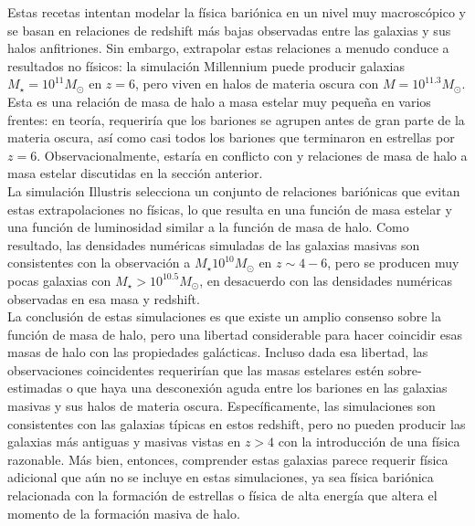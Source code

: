 \documentclass{article}
\begin{document}
Estas recetas intentan modelar la física bariónica en un nivel muy macroscópico y se basan en relaciones de redshift más bajas observadas entre las galaxias y sus halos anfitriones. Sin embargo, extrapolar estas relaciones a menudo conduce a resultados no físicos: la simulación Millennium  puede producir galaxias $M_\star = 10^{11}M_\odot$ en $z = 6$, pero viven en halos de materia oscura con $M = 10^{11.3}M_\odot$. Esta es una relación de masa de halo a masa estelar muy pequeña en varios frentes: en teoría, requeriría que los bariones se agrupen antes de gran parte de la materia oscura, así como casi todos los bariones que terminaron en estrellas por $z = 6$. Observacionalmente, estaría en conflicto con \cite{hildebrandt2009cars} y \cite{finkelstein2015increasing} relaciones de masa de halo a masa estelar discutidas en la sección anterior.\\

La simulación Illustris selecciona un conjunto de relaciones bariónicas que evitan estas extrapolaciones no físicas, lo que resulta en una función de masa estelar y una función de luminosidad similar a la función de masa de halo. Como resultado, las densidades numéricas simuladas de las galaxias masivas son consistentes con la observación a $M_\star 10^{10}M_\odot$ en $z\sim 4 - 6$, pero se producen muy pocas galaxias con $M_\star> 10^{10.5}M_\odot$, en desacuerdo con las densidades numéricas observadas en esa masa y redshift.\\

La conclusión de estas simulaciones es que existe un amplio consenso sobre la función de masa de halo, pero una libertad considerable para hacer coincidir esas masas de halo con las propiedades galácticas. Incluso dada esa libertad, las observaciones coincidentes requerirían que las masas estelares estén sobre-estimadas o que haya una desconexión aguda entre los bariones en las galaxias masivas y sus halos de materia oscura. Específicamente, las simulaciones son consistentes con las galaxias típicas en estos redshift, pero no pueden producir las galaxias más antiguas y masivas vistas en $z> 4$ con la introducción de una física razonable. Más bien, entonces, comprender estas galaxias parece requerir física adicional que aún no se incluye en estas simulaciones, ya sea física bariónica relacionada con la formación de estrellas o física de alta energía que altera el momento de la formación masiva de halo.
\end{document}
